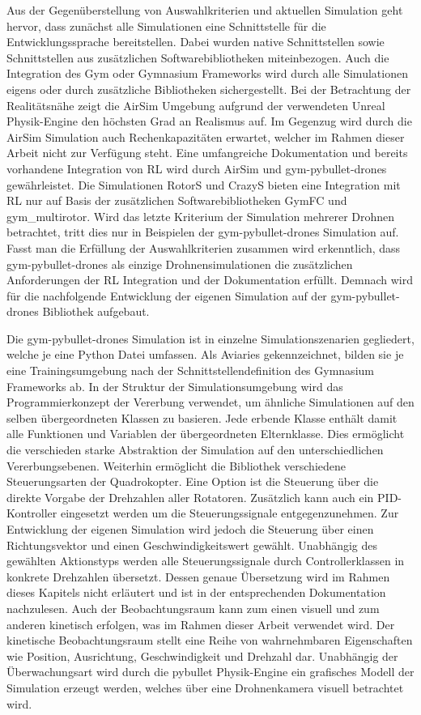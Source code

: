 Aus der Gegenüberstellung von Auswahlkriterien und aktuellen Simulation geht hervor, dass zunächst alle Simulationen eine Schnittstelle für die Entwicklungssprache bereitstellen.
Dabei wurden native Schnittstellen sowie Schnittstellen aus zusätzlichen Softwarebibliotheken miteinbezogen.
Auch die Integration des Gym oder Gymnasium Frameworks wird durch alle Simulationen eigens oder durch zusätzliche Bibliotheken sichergestellt.
Bei der Betrachtung der Realitätsnähe zeigt die AirSim Umgebung aufgrund der verwendeten Unreal Physik-Engine den höchsten Grad an Realismus auf.
Im Gegenzug wird durch die AirSim Simulation auch Rechenkapazitäten erwartet, welcher im Rahmen dieser Arbeit nicht zur Verfügung steht.
Eine umfangreiche Dokumentation und bereits vorhandene Integration von RL wird durch AirSim und gym-pybullet-drones gewährleistet.
Die Simulationen RotorS und CrazyS bieten eine Integration mit RL nur auf Basis der zusätzlichen Softwarebibliotheken GymFC und gym\_multirotor.
Wird das letzte Kriterium der Simulation mehrerer Drohnen betrachtet, tritt dies nur in Beispielen der gym-pybullet-drones Simulation auf.
Fasst man die Erfüllung der Auswahlkriterien zusammen wird erkenntlich, dass gym-pybullet-drones als einzige Drohnensimulationen die zusätzlichen Anforderungen der RL Integration und der Dokumentation erfüllt.
Demnach wird für die nachfolgende Entwicklung der eigenen Simulation auf der gym-pybullet-drones Bibliothek aufgebaut.

Die gym-pybullet-drones Simulation ist in einzelne Simulationszenarien gegliedert, welche je eine Python Datei umfassen.
Als Aviaries gekennzeichnet, bilden sie je eine Trainingsumgebung nach der Schnittstellendefinition des Gymnasium Frameworks ab.
In der Struktur der Simulationsumgebung wird das Programmierkonzept der Vererbung verwendet, um ähnliche Simulationen auf den selben übergeordneten Klassen zu basieren.
Jede erbende Klasse enthält damit alle Funktionen und Variablen der übergeordneten Elternklasse.
Dies ermöglicht die verschieden starke Abstraktion der Simulation auf den unterschiedlichen Vererbungsebenen.
Weiterhin ermöglicht die Bibliothek verschiedene Steuerungsarten der Quadrokopter. 
Eine Option ist die Steuerung über die direkte Vorgabe der Drehzahlen aller Rotatoren. 
Zusätzlich kann auch ein PID-Kontroller eingesetzt werden um die Steuerungssignale entgegenzunehmen.
Zur Entwicklung der eigenen Simulation wird jedoch die Steuerung über einen Richtungsvektor und einen Geschwindigkeitswert gewählt.
Unabhängig des gewählten Aktionstyps werden alle Steuerungssignale durch Controllerklassen in konkrete Drehzahlen übersetzt.
Dessen genaue Übersetzung wird im Rahmen dieses Kapitels nicht erläutert und ist in der entsprechenden Dokumentation nachzulesen.
Auch der Beobachtungsraum kann zum einen visuell und zum anderen kinetisch erfolgen, was im Rahmen dieser Arbeit verwendet wird.
Der kinetische Beobachtungsraum stellt eine Reihe von wahrnehmbaren Eigenschaften wie Position, Ausrichtung, Geschwindigkeit und Drehzahl dar.
Unabhängig der Überwachungsart wird durch die pybullet Physik-Engine ein grafisches Modell der Simulation erzeugt werden, welches über eine Drohnenkamera visuell betrachtet wird.

